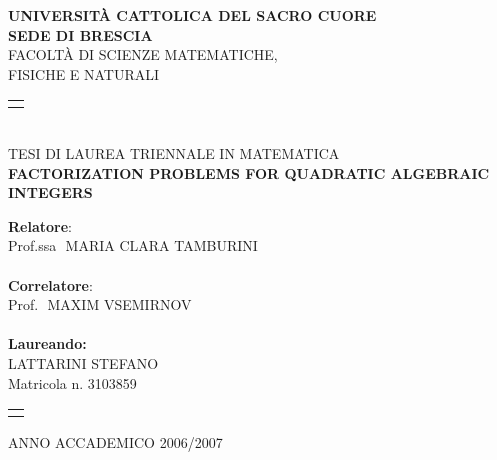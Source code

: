 \begin{titlepage}
\begin{center}
\vspace*{1cm}
\large{\textbf{UNIVERSIT\`A CATTOLICA DEL SACRO CUORE}}\\ 
\vspace{0.5cm}
\large{\textbf{SEDE DI BRESCIA}}\\
\vspace{1cm}
\large{FACOLT\`A DI SCIENZE MATEMATICHE,\\ FISICHE E NATURALI}\\
%
\begin{tabular}{p{14cm}}
\\
\hline
\\
\end{tabular}
\\
\large{TESI DI LAUREA TRIENNALE IN MATEMATICA}\\
\vspace{1.3cm}
\Large{\textbf{FACTORIZATION PROBLEMS FOR QUADRATIC ALGEBRAIC INTEGERS}}\\
\vspace{1.1cm}
%
\end{center}
\textbf{Relatore}:\\
   Prof.ssa\,~MARIA CLARA TAMBURINI\\ \\
\textbf{Correlatore}:\\
   Prof.\,~MAXIM VSEMIRNOV\\ \\
\hspace*{9.7cm}
\textbf{Laureando:}\\
\hspace*{9.7cm}
   LATTARINI STEFANO\\
\hspace*{9.7cm}
   Matricola n. 3103859\\

\begin{center}
\begin{tabular}{p{14cm}}
\\
\hline
\\
\end{tabular}
ANNO ACCADEMICO 2006/2007
\end{center}
\end{titlepage}

